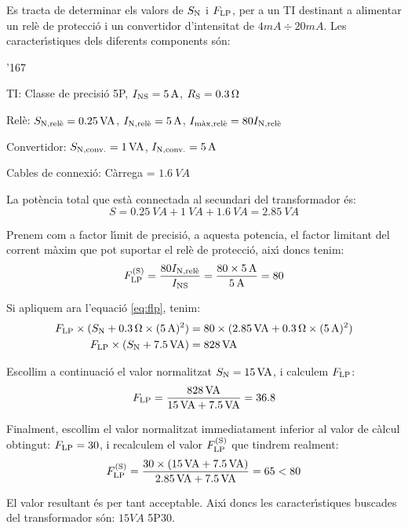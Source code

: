 \begin{exemple}

Es tracta de determinar els valors de $S_\mathrm{N}$ i $F_\mathrm{LP}$,  per
a un TI destinant a alimentar  un rel\`{e} de protecci\'{o} i un convertidor
d'intensitat de $4\unit{mA}\div20\unit{mA}$. Les caracter\'{\i}stiques
dels diferents components s\'{o}n:
\begin{dinglist}{'167}
    \item TI: Classe de precisi\'{o}  5P, $I_\mathrm{NS}=5\mathrm{\,A}$,
    $R_\mathrm{S}=\SI{0,3}{\ensuremath{\mathrm{\Omega}}}$
    \item Rel\`{e}: $S_\mathrm{N,rel\grave{e}}=\SI{0,25}{VA}$,
    $I_\mathrm{N,rel\grave{e}}=5\mathrm{\,A}$, $I_\mathrm{m\grave{a}x,rel\grave{e}}=
    80 I_\mathrm{N,rel\grave{e}}$
    \item Convertidor: $S_\mathrm{N,conv.}=1\mathrm{\,VA}$,
    $I_\mathrm{N,conv.}=5\mathrm{\,A}$
    \item Cables de connexi\'{o}: C\`{a}rrega = $\SI{1,6}{VA}$
\end{dinglist}

La pot\`{e}ncia total que est\`{a} connectada al secundari del transformador
\'{e}s:
\[
    S = \SI{0,25}{VA} + \SI{1}{VA} + \SI{1,6}{VA} = \SI{2,85}{VA}
\]

Prenem com a factor l\'{\i}mit de precisi\'{o},  a aquesta potencia, el
factor limitant del corrent m\`{a}xim que pot suportar el rel\`{e} de
protecci\'{o}, aix\'{\i} doncs tenim:
\[
    F_\mathrm{LP}^\mathrm{(S)} = \frac{80 I_\mathrm{N,rel\grave{e}}}{I_\mathrm{NS}} =
    \frac{80\times 5\mathrm{\,A}}{5\mathrm{\,A}} = 80
\]

Si apliquem ara l'equaci\'{o} \eqref{eq:flp}, tenim:
\begin{align*}
    F_\mathrm{LP}\times(S_\mathrm{N}+\SI{0,3}{\ensuremath{\mathrm{\Omega}}} \times (5\mathrm{\,A})^2) &=
    80\times(\SI{2,85}{VA}+\SI{0,3}{\ensuremath{\mathrm{\Omega}}} \times (5\mathrm{\,A})^2) \\
    F_\mathrm{LP}\times(S_\mathrm{N}+\SI{7,5}{VA}) &= 828\mathrm{\,VA}
\end{align*}

Escollim a continuaci\'{o} el valor normalitzat $S_\mathrm{N}=
15\mathrm{\,VA}$, i calculem $F_\mathrm{LP}$:
\[
    F_\mathrm{LP} = \frac{828\mathrm{\,VA}}{15\mathrm{\,VA}+\SI{7,5}{VA}}
    = \num{36,8}
\]

Finalment, escollim el valor normalitzat immediatament inferior al valor
de c\`{a}lcul obtingut: $F_\mathrm{LP} = 30$, i
recalculem el valor $F_\mathrm{LP}^\mathrm{(S)}$ que tindrem realment:
\[
    F_\mathrm{LP}^\mathrm{(S)} = \frac{30\times(15\mathrm{\,VA} + \SI{7,5}{VA})}
    {\SI{2,85}{VA} + \SI{7,5}{VA}} = 65 < 80
    \]

    El valor resultant \'{e}s per tant acceptable. Aix\'{\i} doncs les
    caracter\'{\i}stiques buscades del transformador s\'{o}n: $15\unit{VA}$ 5P30.

\end{exemple}

